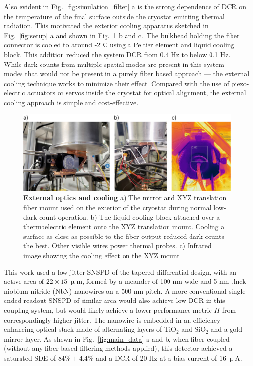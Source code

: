 \documentclass[11pt]{caltech_thesis} %
\begin{document}
Also evident in Fig.~\ref{fig:simulation_filter} a is the strong dependence of DCR on the temperature of the final surface outside the cryostat emitting thermal radiation. This motivated the exterior cooling apparatus sketched in Fig.~\ref{fig:setup} a and shown in Fig.~\ref{fig:cooling} b and c.~The bulkhead holding the fiber connector is cooled to around -2$^\circ$C using a Peltier element and liquid cooling block. This addition reduced the system DCR from 0.4 Hz to below 0.1 Hz. While dark counts from multiple spatial modes are present in this system --- modes that would not be present in a purely fiber based approach --- the external cooling technique works to minimize their effect. Compared with the use of piezo-electric actuators or servos inside the cryostat for optical alignment, the external cooling approach is simple and cost-effective.

\hypertarget{fig:cooling}{%
\begin{figure}
\centering
\includegraphics[width=1\textwidth,height=\textheight]{./chapter_02/figs/exterior_optics_and_cooling_light.png}
\caption[{External optics and cooling}]{\textbf{External optics and cooling} a) The mirror and XYZ translation fiber mount used on the exterior of the cryostat during normal low-dark-count operation. b) The liquid cooling block attached over a thermoelectric element onto the XYZ translation mount. Cooling a surface as close as possible to the fiber output reduced dark counts the best. Other visible wires power thermal probes. c) Infrared image showing the cooling effect on the XYZ mount}
\label{fig:cooling}
\end{figure}
}

This work used a low-jitter SNSPD of the tapered differential design\autocite{Colangelo2023}, with an active area of $22 \times 15 \ \mathrm{\upmu m}$, formed by a meander of 100 nm-wide and 5-nm-thick niobium nitride (NbN) nanowires on a 500 nm pitch. A more conventional single-ended readout SNSPD of similar area would also achieve low DCR in this coupling system, but would likely achieve a lower performance metric $H$ from correspondingly higher jitter. The nanowire is embedded in an efficiency-enhancing optical stack made of alternating layers of TiO$_2$ and SiO$_2$ and a gold mirror layer. As shown in Fig.~\ref{fig:main_data} a and b, when fiber coupled (without any fiber-based filtering methods applied), this detector achieved a saturated SDE of $84\% \pm 4.4 \%$ and a DCR of 20 Hz at a bias current of $16\ \mathrm{\upmu A}$.
\end{document}
